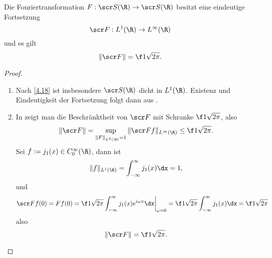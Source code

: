 \begin{st} \label{4.24}
	Die Fouriertransformation $F: \scr S(\R) \to \scr S(\R)$ besitzt eine eindeutige Fortsetzung
	\[
		\scr F: L^1(\R) \to L^\infty(\R)
	\]
	und es gilt
	\[
		\|\scr F\| = \f 1{\sqrt{2\pi}}.
	\]
	\begin{proof}
		\begin{enumerate}[1)]
			\item
				Nach \ref{4.18} ist insbesondere $\scr S(\R)$ dicht in $L^1(\R)$.
				Existenz und Eindeutigkeit der Fortsetzung folgt dann aus .
			\item
				In  zeigt man die Beschränktheit von $\scr F$ mit Schranke $\f 1{\sqrt{2\pi}}$, also
				\[
					\| \scr F\| = \sup_{\|F\|_{L^1(\R)}=1} \|\scr F f\|_{L^\infty(\R)} \le \f 1{\sqrt{2\pi}}.
				\]
				Sei $f := j_1(x) \in C_0^\infty(\R)$, dann ist
				\[
					\|f\|_{L^1(\R)} = \int_{-\infty}^\infty j_1(x) \dx = 1,
				\]
				und
				\[
					\scr F f(0)
					= F f(0)
					= \f 1{\sqrt{2\pi}} \int_{-\infty}^\infty j_1(x) e^{i\omega x} \dx \bigg|_{\omega = 0}
					= \f 1{\sqrt{2\pi}} \int_{-\infty}^\infty j_1(x) \dx
					= \f 1{\sqrt{2\pi}}
				\]
				also
				\[
					\| \scr F\| = \f 1{\sqrt{2\pi}}.
				\]
		\end{enumerate}
	\end{proof}
\end{st}

